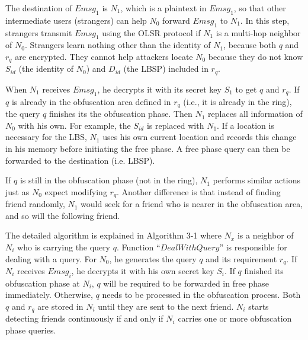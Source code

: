 The destination of ${Emsg}_1$ is ${N}_1$, which is a plaintext in ${Emsg}_1$, so that other intermediate users (strangers) can help $N_0$ forward ${Emsg}_1$ to ${N}_1$. In this step, strangers transmit ${Emsg}_1$ using the OLSR protocol if ${N}_1$ is a multi-hop neighbor of $N_0$. Strangers learn nothing other than the identity of ${N}_1$, because both $q$ and $r_q$ are encrypted. They cannot help attackers locate $N_0$ because they do not know ${S}_{id}$ (the identity of $N_0$) and ${D}_{id}$ (the LBSP) included in $r_q$.

When ${N}_1$ receives ${Emsg}_1$, he decrypts it with its secret key ${S}_{1}$ to get $q$ and $r_q$. If $q$ is already in the obfuscation area defined in ${r}_{q}$ (i.e., it is already in the ring), the query $q$ finishes its the obfuscation phase. Then ${N}_1$ replaces all information of $N_0$ with his own. For example, the ${S}_{id}$ is replaced with ${N}_1$. If a location is necessary for the LBS, ${N}_1$ uses his own current location and records this change in his memory before initiating the free phase. A free phase query can then be forwarded to the destination (i.e. LBSP). 

If $q$ is still in the obfuscation phase (not in the ring), ${N}_1$ performs similar actions just as $N_0$ expect modifying $r_q$. Another difference is that instead of finding friend randomly, ${N}_{1}$ would seek for a friend who is nearer in the obfuscation area, and so will the following friend. 

The detailed algorithm is explained in Algorithm 3-1 where ${N}_{x}$ is a neighbor of ${N}_{i}$ who is carrying the query $q$. Function ``$DealWithQuery$'' is responsible for dealing with a query. For $N_0$, he generates the query $q$ and its requirement $r_q$. If ${N}_{i}$ receives ${Emsg}_{i}$, he decrypts it with his own secret key ${S}_{i}$. If $q$ finished its obfuscation phase at ${N}_{i}$, $q$ will be required to be forwarded in free phase immediately. Otherwise, $q$ needs to be processed in the obfuscation process. Both $q$ and $r_q$ are stored in ${N}_{i}$ until they are sent to the next friend. ${N}_{i}$ starts detecting friends continuously if and only if ${N}_{i}$ carries one or more obfuscation phase queries. 

